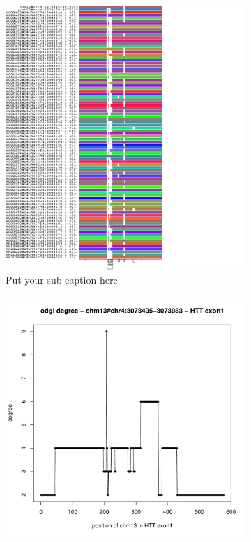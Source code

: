 \begin{figure}[h!]
	\begin{subfigure}{.5\linewidth}
		\centering
		\includegraphics[width=1.0\linewidth]{fig/metrics/chr4.pan.fa.a2fb268.e820cd3.9ea71d8.smooth.gfa.og.HTTex1.og.O.og.w2.convert.png}  
		\caption{Put your sub-caption here}
		\label{fig:sub-third}
	\end{subfigure}
	\begin{subfigure}{.5\linewidth}
		\centering
		\includegraphics[width=1.0\linewidth]{fig/metrics/chr4.HTT.chm13.degree.w1.bed.pdf}  

\end{subfigure}
\end{figure}
